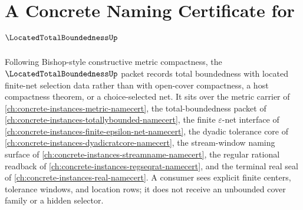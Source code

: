 \chapter{A Concrete Naming Certificate for $\LocatedTotalBoundednessUp$}
\label{ch:concrete-instances-located-total-boundedness-namecert}

Following Bishop-style constructive metric compactness, the $\LocatedTotalBoundednessUp$ packet records total boundedness with located finite-net selection data rather than with open-cover compactness, a host compactness theorem, or a choice-selected net. It sits over the metric carrier of \autoref{ch:concrete-instances-metric-namecert}, the total-boundedness packet of \autoref{ch:concrete-instances-totallybounded-namecert}, the finite $\varepsilon$-net interface of \autoref{ch:concrete-instances-finite-epsilon-net-namecert}, the dyadic tolerance core of \autoref{ch:concrete-instances-dyadicratcore-namecert}, the stream-window naming surface of \autoref{ch:concrete-instances-streamname-namecert}, the regular rational readback of \autoref{ch:concrete-instances-regseqrat-namecert}, and the terminal real seal of \autoref{ch:concrete-instances-real-namecert}. A consumer sees explicit finite centers, tolerance windows, and location rows; it does not receive an unbounded cover family or a hidden selector.

